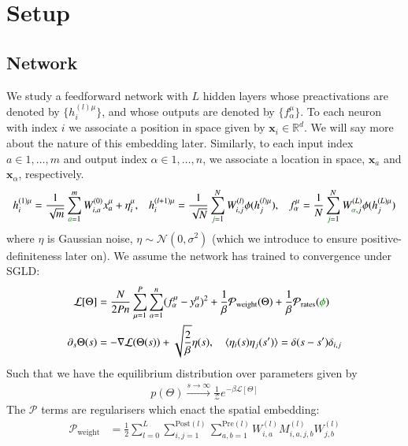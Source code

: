 \documentclass[../main.tex]{subfiles}
\begin{document}
\section{Setup}
\label{sec:setup}

\subsection{Network}

We study a feedforward network with $L$ hidden layers whose preactivations are denoted by $\{ h^{(l)\mu}_{i} \}$, and whose outputs are denoted by $\{ f^{\mu}_\alpha \}$. To each neuron with index $i$ we associate a position in space given by $\mathbf{x}_i \in \mathbb{R}^d$. We will say more about the nature of this embedding later. Similarly, to each input index $a \in 1, \dots, m$ and output index $\alpha \in 1, \dots, n$, we associate a location in space, $\mathbf{x}_a$ and $\mathbf{x}_{\alpha}$, respectively.
\begin{align}
  h^{(1)\mu}_{i} =
    \frac{1}{\sqrt{m}} \sum_{\typo{a}=1}^{m} W^{(0)}_{i,a} x^{\mu}_a + \eta^{\mu}_i, \hfill
  &&
  h^{(l+1)\mu}_{i} = 
    \frac{1}{\sqrt{N}} \sum_{\typo{j}=1}^N W^{(l)}_{i,j} \phi(h^{(l)\mu}_{j}), \hfill 
  &&
  f^{\mu}_{\alpha} =
    \frac{1}{N} \sum_{\typo{j}=1}^{N} W^{(L)}_{\typo{\alpha},j} \phi(h^{(L)\mu}_{j})
  \label{eq:ff-network}
\end{align}
where $\eta$ is Gaussian noise, $\eta \sim \mathcal{N}(0, \sigma^2)$ (which we introduce to ensure positive-definiteness later on). We assume the network has trained to convergence under SGLD:
\begin{align*}
  \mathcal L[\Theta] &=
    \frac{N}{2 P n} 
    \sum_{\mu=1}^{P} \sum_{\alpha=1}^{n} 
      (f^{\mu}_{\alpha} - y^{\mu}_{\alpha})^2 
    + \frac{1}{\beta}  \mathcal{P}_{\text{weight}}(\Theta)
    + \frac{1}{\beta}  \mathcal{P}_{\text{rates}}(\typo{\phi})
  \\
  \partial_s \Theta(s) &=
    -\nabla \mathcal{L}(\Theta(s))  + \sqrt{\frac{2}{\beta}} \eta(s),
  \quad \langle \eta_i(s) \eta_j(s') \rangle = \delta(s - s') \delta_{i,j}
\end{align*}
Such that we have the equilibrium distribution over parameters given by
\begin{align}
  p(\Theta) \xrightarrow{s \rightarrow \infty}  \frac{1}{\mathcal Z} e^{-\beta \mathcal{L}[\Theta]} \label{eq:theta-distr}
\end{align}
The $\mathcal{P}$ terms are regularisers which enact the spatial embedding:
\begin{align}
  \mathcal{P}_{\text{weight}} &=
    \frac12 \sum_{l=0}^{L} \sum_{i,j=1}^{\text{Post}(l)} \sum_{a,b=1}^{\text{Pre}(l)} W^{(l)}_{i,a} M^{(l)}_{i,a,j,b} W^{(l)}_{j,b} \label{eq:prior-weights}
\end{align}
\end{document}

